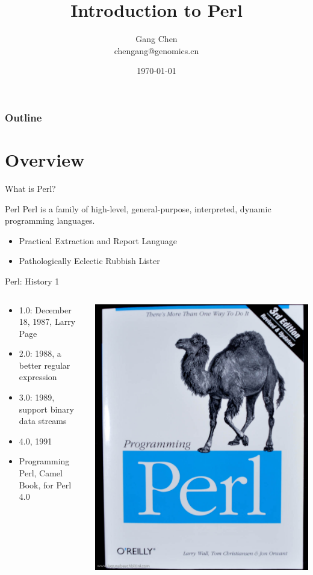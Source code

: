 \documentclass[UTF8]{beamer}
\title{Introduction to Perl}
\author{Gang Chen\\ chengang@genomics.cn}
\date{\today}
\begin{document}
\begin{frame}
\titlepage
\end{frame}
\begin{frame}[t]\frametitle{Outline}
\tableofcontents[hideallsubsections]
\end{frame}

\section{Overview}

\begin{frame}[t]{What is Perl?}
\begin{block}{Perl}
    Perl is a family of high-level, general-purpose, interpreted, dynamic programming languages.
  \begin{itemize}
    \item Practical Extraction and Report Language
    \item Pathologically Eclectic Rubbish Lister
  \end{itemize}
\end{block}
\end{frame}

\begin{frame}{Perl: History 1}
\begin{columns}
  \begin{column}{.7\textwidth}
\begin{itemize}
  \item 1.0: December 18, 1987, Larry Page
  \item 2.0: 1988, a better regular expression
  \item 3.0: 1989, support binary data streams
  \item 4.0, 1991
  \item Programming Perl, Camel Book, for Perl 4.0

\end{itemize}
\end{column}
\begin{column}{.3\textwidth}
\includegraphics[width=.3\textwidth]{programmingperl.jpg}
\end{column}
\end{columns}
\end{frame}
\end{document}
